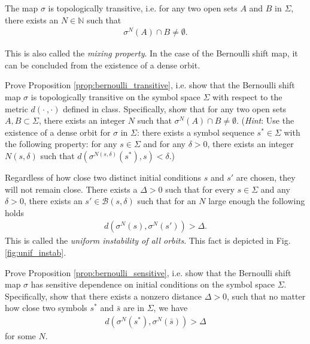 \begin{proposition}[] \label{prop:bernoulli_transitive}
	The map $\sigma$ is topologically transitive, i.e. for any two open sets $A$ and $B$ in $\Sigma$, there exists an $N \in \mathbb{N}$ such that
	\begin{align}
		\sigma^{N}(A) \cap B \neq \emptyset.
	\end{align}
\end{proposition}
	This is also called the \emph{mixing property}. In the case of the Bernoulli shift map, it can be concluded from the existence of a dense orbit.

\begin{exercise}
	Prove Proposition \ref{prop:bernoulli_transitive}, i.e. show that the Bernoulli shift map $\sigma$ is topologically transitive on the symbol space $\Sigma$ with respect to the metric $d(\cdot~,\cdot)$ defined in class. Specifically, show that for any two open sets $A,B\subset\Sigma$, there exists an integer $N$ such that $\sigma^{N}(A)\cap B\neq\emptyset$. (\emph{Hint}: Use the existence of a dense orbit for $\sigma$ in $\Sigma$: there exists a symbol sequence $s^{*}\in\Sigma$ with the following property: for any $s\in\Sigma$ and for any $\delta>0$, there exists an integer $N(s,\delta)$ such that $d(\sigma^{N(s,\delta)}(s^{*}),s)<\delta$.)
\end{exercise}
	
\begin{proposition} \label{prop:bernoulli_sensitive}
	Regardless of how close two distinct initial conditions $s$ and $s'$ are chosen, they will not remain close. There exists a $\Delta>0$ such that for every $s\in\Sigma$ and any $\delta>0$, there exists an $s' \in \mathcal{B}\left(s, \delta\right)$ such that for an $N$ large enough the following holds
	\begin{align}
		d(\sigma^{N}(s), \sigma^{N}(s') ) > \Delta.
	\end{align}
	This is called the \emph{uniform instability of all orbits}. This fact is depicted in Fig. \ref{fig:unif_instab}.	
\end{proposition}

\begin{exercise}
	Prove Proposition \ref{prop:bernoulli_sensitive}, i.e. show that the Bernoulli shift map $\sigma$ has sensitive dependence on initial conditions on the symbol space $\Sigma$. Specifically, show that there exists a nonzero distance $\Delta>0$, such that no matter how close two symbols $s^{\ast}$ and $\bar{s}$ are in $\Sigma$, we have
\begin{align}
d\left(\sigma^{N}(s^{\ast}),\sigma^{N}(\bar{s})\right)>\Delta
\end{align}
for some $N.$
\end{exercise}

